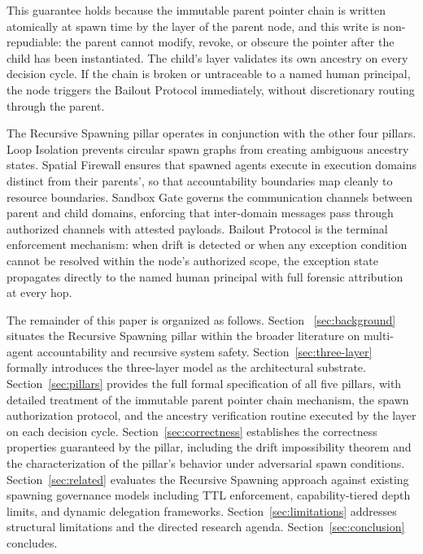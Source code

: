 This guarantee holds because the immutable parent pointer chain is written
atomically at spawn time by the \Fact{} layer of the parent node, and this
write is non-repudiable: the parent cannot modify, revoke, or obscure the
pointer after the child has been instantiated.  The child's \Fact{} layer
validates its own ancestry on every decision cycle.  If the chain is broken
or untraceable to a named human principal, the node triggers the Bailout
Protocol immediately, without discretionary routing through the parent.

The Recursive Spawning pillar operates in conjunction with the other four
\bxthree{} pillars.  Loop Isolation prevents circular spawn graphs from
creating ambiguous ancestry states.  Spatial Firewall ensures that spawned
agents execute in execution domains distinct from their parents', so that
accountability boundaries map cleanly to resource boundaries.  Sandbox Gate
governs the communication channels between parent and child domains,
enforcing that inter-domain messages pass through authorized channels with
attested payloads.  Bailout Protocol is the terminal enforcement mechanism:
when drift is detected or when any exception condition cannot be resolved
within the node's authorized scope, the exception state propagates directly
to the named human principal with full forensic attribution at every hop.

The remainder of this paper is organized as follows.  Section~
\ref{sec:background} situates the Recursive Spawning pillar within the
broader literature on multi-agent accountability and recursive system safety.
Section~\ref{sec:three-layer} formally introduces the \bxthree{} three-layer
model as the architectural substrate.  Section~\ref{sec:pillars} provides the
full formal specification of all five pillars, with detailed treatment of the
immutable parent pointer chain mechanism, the spawn authorization protocol,
and the ancestry verification routine executed by the \Fact{} layer on each
decision cycle.  Section~\ref{sec:correctness} establishes the correctness
properties guaranteed by the pillar, including the drift impossibility theorem
and the characterization of the pillar's behavior under adversarial spawn
conditions.  Section~\ref{sec:related} evaluates the Recursive Spawning
approach against existing spawning governance models including TTL enforcement,
capability-tiered depth limits, and dynamic delegation frameworks.
Section~\ref{sec:limitations} addresses structural limitations and the
directed research agenda.  Section~\ref{sec:conclusion} concludes.
